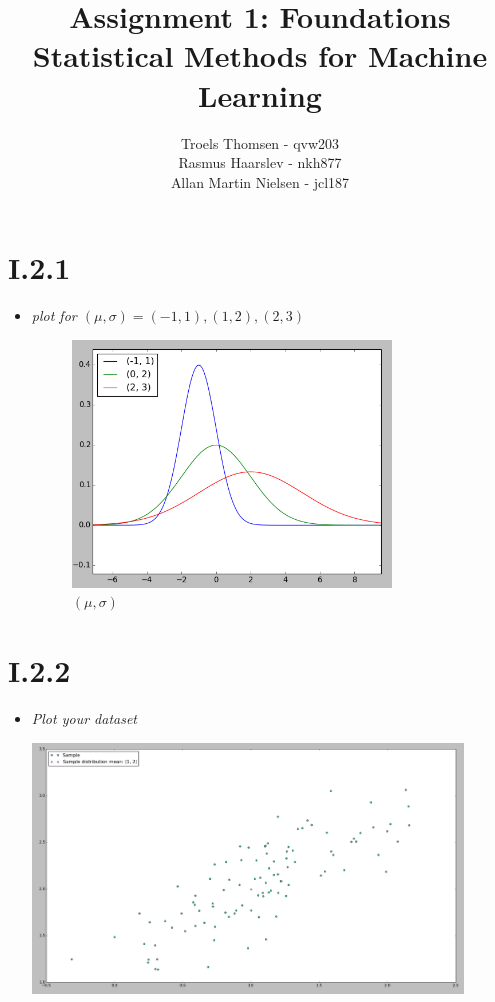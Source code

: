 \documentclass[12pt, a4paper]{article}
\title{Assignment 1: Foundations\\Statistical Methods for Machine Learning}
\author{Troels Thomsen - qvw203\\Rasmus Haarslev - nkh877\\Allan Martin Nielsen - jcl187}
\begin{document}
\pagestyle{empty}
\maketitle
\newpage

\pagestyle{fancy}

\section{I.2.1}
\begin{itemize}
\item \textit{plot for $(\mu, \sigma) = {(-1, 1), (1, 2), (2, 3)}$}

\begin{figure}[!h]
    \centering
    \includegraphics[width=0.8\textwidth]{1.png}
    \caption{$(\mu, \sigma)$}
    \label{fig:awesome_image}
\end{figure}
\end{itemize}
\section{I.2.2}
\begin{itemize}
\item \textit{Plot your dataset}

\includegraphics[width=0.9\textwidth]{2.png}

\end{itemize}
\end{document}
